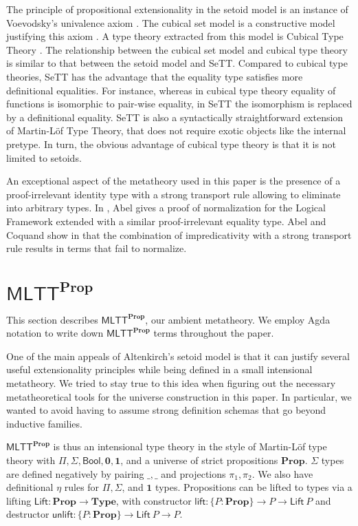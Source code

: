 \documentclass[a4paper,UKenglish,cleveref, autoref, thm-restate]{lipics-v2019}
\newcommand{\mlttp}{\textsf{MLTT}^{\mProp}}
\newcommand{\mType}{\mathbf{Type}}
\newcommand{\mProp}{\mathbf{Prop}}
\begin{document}
The principle of propositional extensionality in the setoid model is an instance
of Voevodsky's univalence axiom \cite{hottbook}. The cubical set model is a
constructive model justifying this axiom \cite{cubical-sets}. A type theory
extracted from this model is Cubical Type Theory \cite{cubical}. The
relationship between the cubical set model and cubical type theory is similar to
that between the setoid model and SeTT.
%
Compared to cubical type theories, SeTT has the advantage that the equality type
satisfies more definitional equalities. For instance, whereas in cubical type
theory equality of functions is isomorphic to pair-wise equality, in SeTT the
isomorphism is replaced by a definitional equality. SeTT is also a syntactically
straightforward extension of Martin-L\"of Type Theory, that does not require
exotic objects like the internal pretype. In turn, the obvious advantage of
cubical type theory is that it is not limited to setoids.

An exceptional aspect of the metatheory used in this paper is the presence of a
proof-irrelevant identity type with a strong transport rule allowing to
eliminate into arbitrary types.
%
In \cite{abel:nbe09}, Abel gives a proof of normalization for the
Logical Framework extended with a similar proof-irrelevant equality type.
%
Abel and Coquand show in \cite{abel2019failure} that the combination of
impredicativity with a strong transport rule results in terms that fail to
normalize.

\section{$\mlttp$}\label{sec:metatheory}

This section describes $\mlttp$, our ambient metatheory. We employ Agda notation
to write down $\mlttp$ terms throughout the paper.

One of the main appeals of Altenkirch's setoid model is that it can justify
several useful extensionality principles while being defined in a small
intensional metatheory.
%
We tried to stay true to this idea when figuring out the necessary
metatheoretical tools for the universe construction in this paper. In
particular, we wanted to avoid having to assume strong definition schemas that
go beyond inductive families.

$\mlttp$ is thus an intensional type theory in the style of Martin-L\"of type
theory with $\Pi, \Sigma, \textsf{Bool}, \mathbf{0}, \mathbf{1}$, and a universe
of strict propositions $\mProp$. $\Sigma$ types are defined negatively by
pairing $\_,\_$ and projections $\pi_1, \pi_2$. We also have definitional $\eta$
rules for $\Pi, \Sigma$, and $\mathbf{1}$ types. Propositions can be lifted to
types via a lifting $\textsf{Lift} : \mProp \to \mType$, with constructor
$\textsf{lift} : \{P : \mProp \} \to P \to \textsf{Lift}\ P$ and destructor
$\textsf{unlift} : \{P : \mProp \} \to \textsf{Lift}\ P \to P$.
\end{document}

